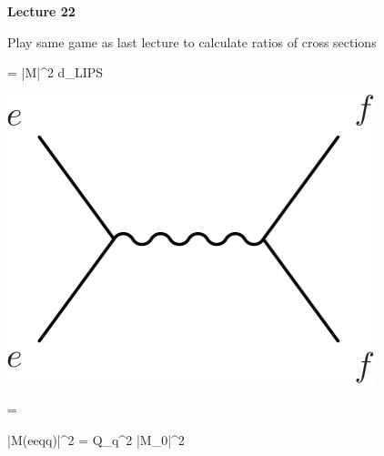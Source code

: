 
\usepackage{braket}
\usepackage{bbm}
\usepackage{relsize}
\usepackage{tcolorbox}




\usepackage{fancyhdr}

\fancyhf{}


\thispagestyle{fancy}

\begin{center}
{\huge \textbf{Lecture 22}}
\end{center}

{\fontsize{14}{16}\selectfont


Play same game as last lecture to calculate ratios of cross sections

\begin{minipage}{0.6\textwidth}
\be
\sigma =   |M|^2 d\Pi_{LIPS}
\ee
\end{minipage} \hfill
\begin{minipage}{0.3\textwidth}
\includegraphics[width=0.8\textwidth]{./eeToff.pdf}
\end{minipage} 



\be
{} = 
\ee

\be
|M(ee\rightarrow qq)|^2 = Q_q^2 |M_0|^2
\ee

}
